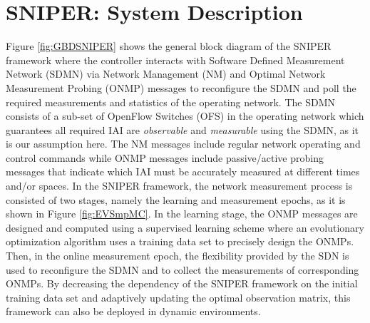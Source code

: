 \section{SNIPER: System Description}  \label{sec:SNIPERSysDsc}
Figure \ref{fig:GBDSNIPER} shows the general block diagram of the SNIPER framework where the controller interacts with Software Defined Measurement Network (SDMN) via Network Management (NM) and Optimal Network Measurement Probing (ONMP) messages to reconfigure the SDMN and poll the required measurements and statistics of the operating network. The SDMN consists of a sub-set of OpenFlow Switches (OFS) in the operating network which guarantees all required IAI are \emph{observable} and \emph{measurable} using the SDMN, as it is our assumption here. The NM messages include regular network operating and control commands while ONMP messages include passive/active probing messages that indicate which IAI must be accurately measured at different times and/or spaces. In the SNIPER framework, the network measurement process is consisted of two stages, namely the learning and measurement epochs, as it is shown in Figure \ref{fig:EVSmpMC}. In the learning stage, the ONMP messages are designed and computed using a supervised learning scheme where an evolutionary optimization algorithm uses a training data set to precisely design the ONMPs. Then, in the online measurement epoch, the flexibility provided by the SDN is used to reconfigure the SDMN and to collect the measurements of corresponding ONMPs. By decreasing the dependency of the SNIPER framework on the initial training data set and adaptively updating the optimal observation matrix, this framework can also be deployed in dynamic environments.

